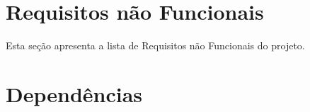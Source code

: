 \documentclass{article}
\begin{document}
			
			    
			      
	
	
			  
\section{Requisitos não Funcionais}
Esta seção apresenta a lista de Requisitos não Funcionais do projeto.
		  
	
		  
\section{Dependências}
	
	  
	
% 
% 
		  
\end{document}
